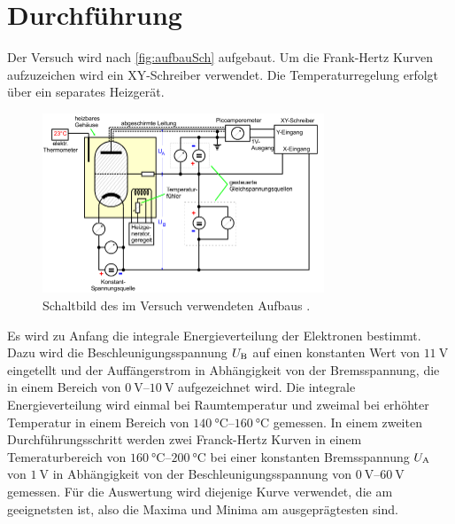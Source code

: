 \section{Durchführung}
\label{sec:Durchführung}

Der Versuch wird nach \autoref{fig:aufbauSch} aufgebaut. Um die Frank-Hertz Kurven aufzuzeichen wird ein XY-Schreiber verwendet. Die Temperaturregelung erfolgt über ein separates Heizgerät.

\begin{figure}[H]
    \centering
    \includegraphics[width=0.75\textwidth]{data/schaltbild.png}
    \caption{Schaltbild des im Versuch verwendeten Aufbaus \cite{Anleitung601}.}
    \label{fig:aufbauSch}
\end{figure}

\noindent
Es wird zu Anfang die integrale Energieverteilung der Elektronen bestimmt. Dazu wird die Beschleunigungsspannung $U_{\text B}$ auf einen konstanten Wert von $\SI{11}{\volt}$ eingetellt und der Auffängerstrom in
Abhängigkeit von der Bremsspannung, die in einem Bereich von $\SIrange{0}{10}{\volt}$ aufgezeichnet wird. Die integrale Energieverteilung wird einmal bei Raumtemperatur und zweimal bei erhöhter Temperatur in 
einem Bereich von $\SIrange{140}{160}{\degreeCelsius}$ gemessen.
In einem zweiten Durchführungsschritt werden zwei Franck-Hertz Kurven in einem Temeraturbereich von $\SIrange{160}{200}{\degreeCelsius}$ bei einer konstanten Bremsspannung $U_{\text A}$ von $\SI{1}{\volt}$ in Abhängigkeit 
von der Beschleunigungsspannung von $\SIrange{0}{60}{\volt}$ gemessen. Für die Auswertung wird diejenige Kurve verwendet, die am geeignetsten ist, also die Maxima und Minima am ausgeprägtesten sind.
